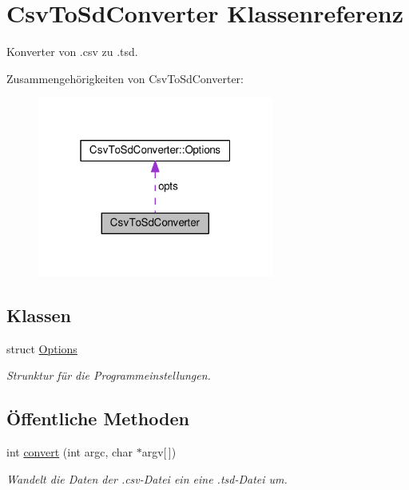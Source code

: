 \hypertarget{classCsvToSdConverter}{\section{Csv\-To\-Sd\-Converter Klassenreferenz}
\label{classCsvToSdConverter}
}


Konverter von .csv zu .tsd.  




Zusammengehörigkeiten von Csv\-To\-Sd\-Converter\-:
\nopagebreak
\begin{figure}[H]
\begin{center}
\leavevmode
\includegraphics[width=220pt]{classCsvToSdConverter__coll__graph}
\end{center}
\end{figure}
\subsection*{Klassen}
\begin{DoxyCompactItemize}
\item 
struct \hyperlink{structCsvToSdConverter_1_1Options}{Options}
\begin{DoxyCompactList}\small\item\em Strunktur für die Programmeinstellungen. \end{DoxyCompactList}\end{DoxyCompactItemize}
\subsection*{Öffentliche Methoden}
\begin{DoxyCompactItemize}
\item 
int \hyperlink{classCsvToSdConverter_a226c1dfaf88433cc9edf6570798231ec}{convert} (int argc, char $\ast$argv\mbox{[}$\,$\mbox{]})
\begin{DoxyCompactList}\small\item\em Wandelt die Daten der .csv-\/\-Datei ein eine .tsd-\/\-Datei um. \end{DoxyCompactList}\end{DoxyCompactItemize}
